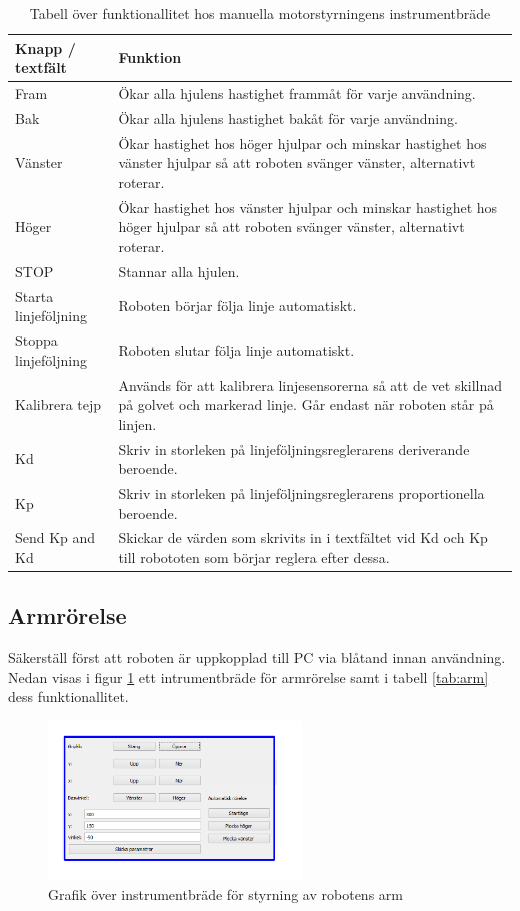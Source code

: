 \documentclass[a4paper,12pt]{article}
\begin{document}
\begin{table}[H]
\centering
\begin{tabularx}{\textwidth}{|l|X|}
\hline \textbf{Knapp / textfält} & \textbf{Funktion} \\ \hline
Fram & Ökar alla hjulens hastighet frammåt för varje användning. \\ \hline
Bak & Ökar alla hjulens hastighet bakåt för varje användning. \\ \hline
Vänster & Ökar hastighet hos höger hjulpar och minskar hastighet hos vänster hjulpar så att roboten svänger vänster, alternativt roterar. \\ \hline
Höger & Ökar hastighet hos vänster hjulpar och minskar hastighet hos höger hjulpar så att roboten svänger vänster, alternativt roterar. \\ \hline
STOP & Stannar alla hjulen. \\ \hline
Starta linjeföljning & Roboten börjar följa linje automatiskt. \\ \hline
Stoppa linjeföljning & Roboten slutar följa linje automatiskt. \\ \hline
Kalibrera tejp & Används för att kalibrera linjesensorerna så att de vet skillnad på golvet och markerad linje. Går endast när roboten står på linjen. \\ \hline
Kd & Skriv in storleken på linjeföljningsreglerarens deriverande beroende. \\ \hline
Kp & Skriv in storleken på linjeföljningsreglerarens proportionella beroende. \\ \hline
Send Kp and Kd & Skickar de värden som skrivits in i textfältet vid Kd och Kp till robototen som börjar reglera efter dessa. \\ \hline

\end{tabularx}
\caption{Tabell över funktionallitet hos manuella motorstyrningens instrumentbräde}
\label{tab:motor}
\end{table}

\subsection{Armrörelse}
Säkerställ först att roboten är uppkopplad till PC via blåtand innan användning. Nedan visas i figur \ref{fig:pc_arm} ett intrumentbräde för armrörelse samt i tabell \ref{tab:arm} dess funktionallitet.

\begin{figure}[H]
	\centering
	\includegraphics[width=0.6\textwidth]{armrorelse.pdf}
	\caption{Grafik över instrumentbräde för styrning av robotens arm}
	\label{fig:pc_arm}
\end{figure}
\end{document}
